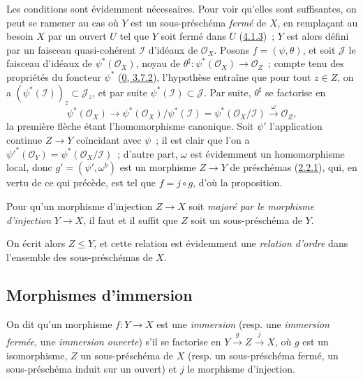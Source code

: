 Les conditions sont évidemment nécessaires. Pour voir qu'elles sont
suffisantes, on peut se ramener au cas où $Y$ est un sous-préschéma
\emph{fermé} de $X$, en remplaçant au besoin $X$ par un ouvert $U$ tel que
$Y$ soit fermé dans $U$ (\hyperref[I.4.1.3-fr]{4.1.3})~; $Y$ est alors défini
par un faisceau quasi-cohérent $\mathscr{I}$ d'idéaux de $\mathscr{O}_X$.
Posons $f=(\psi,\theta)$, et soit $\mathscr{J}$ le faisceau d'idéaux de
$\psi^*(\mathscr{O}_X)$, noyau de
$\theta^\sharp:\psi^*(\mathscr{O}_X)\to\mathscr{O}_Z$~; compte tenu des
propriétés du foncteur $\psi^*$ (\hyperref[0.3.7.2-fr]{0, 3.7.2}),
l'hypothèse entraîne que pour tout $z\in Z$, on a
$(\psi^*(\mathscr{I}))_z\subset\mathscr{J}_z$, et par suite
$\psi^*(\mathscr{I})\subset\mathscr{J}$. Par suite, $\theta^\sharp$ se
factorise en
\[
  \psi^*(\mathscr{O}_X)\longrightarrow
  \psi^*(\mathscr{O}_X)/\psi^*(\mathscr{I})
  =\psi^*(\mathscr{O}_X/\mathscr{I})
  \xrightarrow{\omega}\mathscr{O}_Z,
\]
la première flèche étant l'homomorphisme canonique. Soit $\psi'$ l'application
continue $Z\to Y$ coïncidant avec $\psi$~; il est clair que l'on a
${\psi'}^*(\mathscr{O}_Y)=\psi^*(\mathscr{O}_X/\mathscr{I})$~; d'autre part,
$\omega$ est évidemment un homomorphisme local, donc
$g'=(\psi',\omega^b)$ est un morphisme $Z\to Y$
de préschémas (\hyperref[I.2.2.1-fr]{2.2.1}), qui, en vertu de ce qui précède,
est tel que $f=j\circ g$, d'où la proposition.

\begin{corollary}[4.1.10]
\label{I.4.1.10-fr}
Pour qu'un morphisme d'injection $Z\to X$ soit \emph{majoré par le morphisme
d'injection} $Y\to X$, il faut et il suffit que $Z$ soit un sous-préschéma de
$Y$.
\end{corollary}

On écrit alors $Z\leq Y$, et cette relation est évidemment une
\emph{relation d'ordre} dans l'ensemble des sous-préschémas de $X$.

\subsection{Morphismes d'immersion}
\label{subsection:I.4.2-fr}

\begin{definition}[4.2.1]
\label{I.4.2.1-fr}
On dit qu'un morphisme $f:Y\to X$ est une \emph{immersion} (resp. une
\emph{immersion fermée}, une \emph{immersion ouverte}) s'il se factorise en
$Y\xrightarrow{g}Z\xrightarrow{j}X$, où $g$ est un isomorphisme, $Z$ un
sous-préschéma de $X$ (resp. un sous-préschéma fermé, un sous-préschéma induit
sur un ouvert) et $j$ le morphisme d'injection.
\end{definition}

